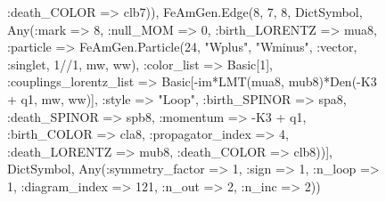 \documentclass{revtex4}
\begin{document}
\begin{figure}[!htb]
\begin{center}
{:death_COLOR => clb7)), FeAmGen.Edge(8, 7, 8, Dict{Symbol, Any}(:mark => 8, :null_MOM => 0, :birth_LORENTZ => mua8, :particle => FeAmGen.Particle(24, "Wplus", "Wminus", :vector, :singlet, 1//1, mw, ww), :color_list => Basic[1], :couplings_lorentz_list => Basic[-im*LMT(mua8, mub8)*Den(-K3 + q1, mw, ww)], :style => "Loop", :birth_SPINOR => spa8, :death_SPINOR => spb8, :momentum => -K3 + q1, :birth_COLOR => cla8, :propagator_index => 4, :death_LORENTZ => mub8, :death_COLOR => clb8))], Dict{Symbol, Any}(:symmetry_factor => 1, :sign => 1, :n_loop => 1, :diagram_index => 121, :n_out => 2, :n_inc => 2)) 
}
\end{center}
\end{figure}
\end{document}
